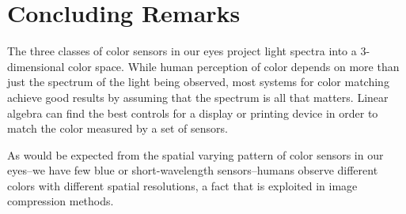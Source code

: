 \section{Concluding Remarks}
The three classes of color sensors in our eyes project light spectra into a 3-dimensional color space.  While human perception of color depends on more than just the spectrum of the light being observed, most systems for color matching achieve good results by assuming that the spectrum is all that matters.  Linear algebra can find the best controls for a display or printing device in order to match the color measured by a set of sensors.  

As would be expected from the spatial varying pattern of color sensors in our eyes--we have few blue or short-wavelength sensors--humans observe different colors with different spatial resolutions, a fact that is exploited in image compression methods.
